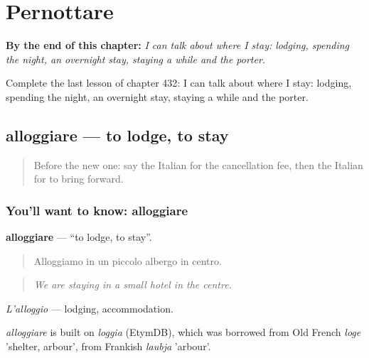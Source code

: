 
\chapter{Pernottare}
\label{ch:it-pernottare}

\begin{chapteropening}
\textbf{By the end of this chapter:} \emph{I can talk about where I stay: lodging, spending the night, an overnight stay, staying a while and the porter.}

Complete the last lesson of chapter 432: I can talk about where I stay: lodging, spending the night, an overnight stay, staying a while and the porter.
\end{chapteropening}

\section[alloggiare]{alloggiare — to lodge, to stay}

\label{lesson:IT-C432-alloggiare}



\begin{quote}
Before the new one: say the Italian for the cancellation fee, then the Italian for to bring forward.
\end{quote}

\subsection*{You'll want to know: alloggiare}
\textbf{alloggiare} — \textquotedblleft{}to lodge, to stay\textquotedblright{}.

\begin{quote}
Alloggiamo in un piccolo albergo in centro.
\end{quote}

\begin{quote}
\emph{We are staying in a small hotel in the centre.}
\end{quote}

\emph{L'alloggio} — lodging, accommodation.

\begin{cousinweb}
\emph{alloggiare} is built on \emph{loggia} (EtymDB), which was borrowed from Old French \emph{loge} 'shelter, arbour', from Frankish \emph{laubja} 'arbour'.
\end{cousinweb}

